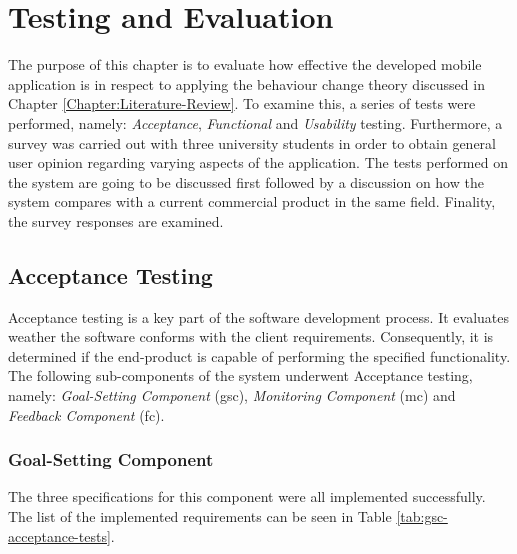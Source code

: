 \chapter{Testing and Evaluation}
\label{chapter:testing-and-eval}
The purpose of this chapter is to evaluate how effective the developed mobile application is in respect to applying the behaviour change theory discussed in Chapter \ref{Chapter:Literature-Review}. To examine this, a series of tests were performed, namely: \textit{Acceptance}, \textit{Functional} and \textit{Usability} testing. Furthermore, a survey was carried out with three university students in order to obtain general user opinion regarding varying aspects of the application. The tests performed on the system are going to be discussed first followed by a discussion on how the system compares with a current commercial product in the same field. Finality, the survey responses are examined.

\section{Acceptance Testing}
Acceptance testing is a key part of the software development process. It evaluates weather the software conforms with the client requirements. Consequently, it is determined if the end-product is capable of performing the specified functionality. The following sub-components of the system underwent Acceptance testing, namely: \textit{Goal-Setting Component} (\gls{gsc}), \textit{Monitoring Component} (\gls{mc}) and \textit{Feedback Component} (\gls{fc}).

\subsection{Goal-Setting Component}
The three specifications for this component were all implemented successfully. The list of the implemented requirements can be seen in Table \ref{tab:gsc-acceptance-tests}. 

